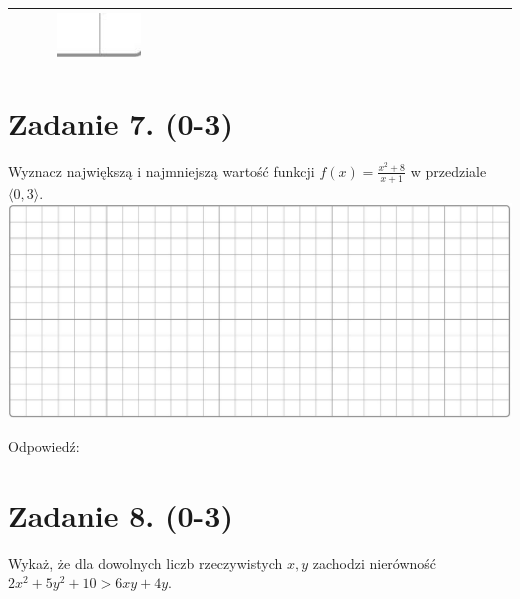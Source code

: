 \documentclass[10pt]{article}
\begin{document}
\begin{center}
\begin{tabular}{|c|c|c|c|c|c|c|c|c|c|c|c|c|c|c|c|c|c|c|c|c|c|c|c|c|c|c|c|c|c|}
 &  &  & \includegraphics[max width=\textwidth]{2024_11_21_d15133c79177ee6989d3g-04(4)}
 \\
\hline
\end{tabular}
\end{center}

\section*{Zadanie 7. (0-3)}
Wyznacz największą i najmniejszą wartość funkcji \(f(x)=\frac{x^{2}+8}{x+1}\) w przedziale \(\langle 0,3\rangle\).\\
\includegraphics[max width=\textwidth, center]{2024_11_21_d15133c79177ee6989d3g-04(5)}

Odpowiedź: \(\qquad\)

\section*{Zadanie 8. (0-3)}
Wykaż, że dla dowolnych liczb rzeczywistych \(x, y\) zachodzi nierówność \(2 x^{2}+5 y^{2}+10>6 x y+4 y\).
\end{document}
